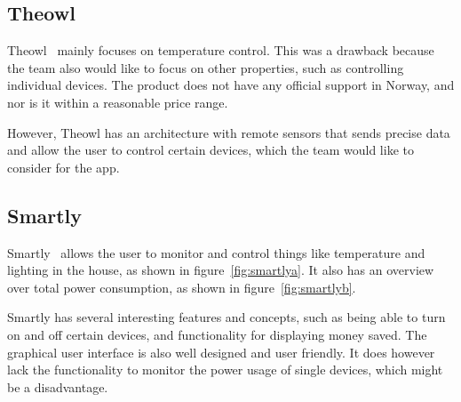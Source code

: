 \subsection{Theowl}

Theowl~\cite{theowl} mainly focuses on temperature control. This was a drawback because the team also would like to focus on other properties, such as controlling individual devices. The product does not have any official support in Norway, and nor is it within a reasonable price range. 

However, Theowl has an architecture with remote sensors that sends precise data and allow the user to control certain devices, which the team would like to consider for the app.


\subsection{Smartly}

Smartly~\cite{smartly} allows the user to monitor and control things like temperature and lighting in the house, as shown in figure~\ref{fig:smartlya}. It also has an overview over total power consumption, as shown in figure~\ref{fig:smartlyb}.

Smartly has several interesting features and concepts, such as being able to turn on and off certain devices, and functionality for displaying money saved. The graphical user interface is also well designed and user friendly. It does however lack the functionality to monitor the power usage of single devices, which might be a disadvantage.

